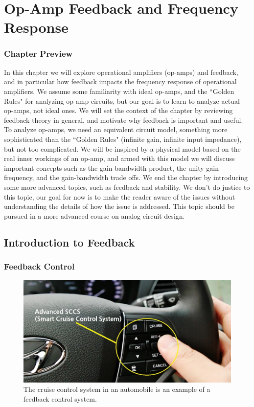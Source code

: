 

\chapter{Op-Amp Feedback and Frequency Response}




\graphicspath{{./figs_opamps_fb/}}




\subsection{Chapter Preview}

In this chapter we will explore operational amplifiers (op-amps) and feedback, and in particular how feedback impacts the frequency response of operational amplifiers.  We assume some familiarity with ideal op-amps, and the ``Golden Rules" for analyzing op-amp circuits, but our goal is to learn to analyze actual op-amps, not ideal ones.  We will set the context of the chapter by reviewing feedback theory in general, and motivate why feedback is important and useful.  To analyze op-amps, we need an equivalent circuit model, something more sophisticated than the ``Golden Rules" (infinite gain, infinite input impedance), but not too complicated.   We will be inspired by a physical model based on the real inner workings of an op-amp, and armed with this model we will discuss important concepts such as the gain-bandwidth product, the unity gain frequency, and the gain-bandwidth trade offs.  We end the chapter by introducing some more advanced topics, such as feedback and stability.  We don't do justice to this topic, our goal for now is to make the reader aware of the issues without understanding the details of how the issue is addressed.  This topic should be pursued in a more advanced course on analog circuit design. 
 


\section{Introduction to Feedback}



\subsection{Feedback Control}

\begin{figure}[tb]
\begin{center}
\includegraphics[width=.5\columnwidth]{image_0.png}
\end{center}
\caption{The cruise control system in an automobile is an example of a feedback control system.} \label{fig:image_0.png}
\end{figure}

